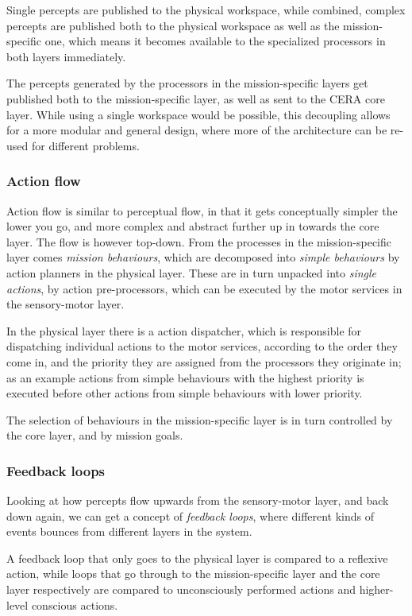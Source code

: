 Single percepts are published to the physical workspace, while combined, complex
percepts are published both to the physical workspace as well as the
mission-specific one, which means it becomes available to the specialized
processors in both layers immediately.

The percepts generated by the processors in the mission-specific layers
get published both to the mission-specific layer, as well as sent to the CERA
core layer. While using a single workspace would be possible, this decoupling
allows for a more modular and general design, where more of the architecture
can be re-used for different problems.

\subsubsection{Action flow}
Action flow is similar to perceptual flow, in that it gets conceptually simpler
the lower you go, and more complex and abstract further up in towards the core
layer. The flow is however top-down. From the processes in the mission-specific
layer comes \textit{mission behaviours}, which are decomposed into
\textit{simple behaviours} by action planners in the physical layer. These are
in turn unpacked into \textit{single actions}, by action pre-processors, which
can be executed by the motor services in the sensory-motor layer.

In the physical layer there is a action dispatcher, which is responsible for
dispatching individual actions to the motor services, according to the order
they come in, and the priority they are assigned from the processors they
originate in; as an example actions from simple behaviours with the highest
priority is executed before other actions from simple behaviours with lower
priority.

The selection of behaviours in the mission-specific layer is in turn controlled
by the core layer, and by mission goals.

\subsubsection{Feedback loops}
Looking at how percepts flow upwards from the sensory-motor layer, and back
down again, we can get a concept of \textit{feedback loops}, where different
kinds of events bounces from different layers in the system.

A feedback loop that only goes to the physical layer is compared to a reflexive
action, while loops that go through to the mission-specific layer and the core
layer respectively are compared to unconsciously performed actions and
higher-level conscious actions.

